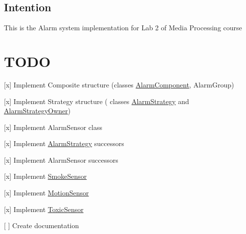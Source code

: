 \subsection*{Intention}

This is the Alarm system implementation for Lab 2 of Media Processing course

\section*{T\+O\+DO}


\begin{DoxyItemize}
\item \mbox{[}x\mbox{]} Implement Composite structure (classes \hyperlink{classAlarmComponent}{Alarm\+Component}, Alarm\+Group)
\item \mbox{[}x\mbox{]} Implement Strategy structure ( classes \hyperlink{classAlarmStrategy}{Alarm\+Strategy} and \hyperlink{classAlarmStrategyOwner}{Alarm\+Strategy\+Owner})
\item \mbox{[}x\mbox{]} Implement Alarm\+Sensor class
\item \mbox{[}x\mbox{]} Implement \hyperlink{classAlarmStrategy}{Alarm\+Strategy} successors
\item \mbox{[}x\mbox{]} Implement Alarm\+Sensor successors
\begin{DoxyItemize}
\item \mbox{[}x\mbox{]} Implement \hyperlink{classSmokeSensor}{Smoke\+Sensor}
\item \mbox{[}x\mbox{]} Implement \hyperlink{classMotionSensor}{Motion\+Sensor}
\item \mbox{[}x\mbox{]} Implement \hyperlink{classToxicSensor}{Toxic\+Sensor}
\end{DoxyItemize}
\item \mbox{[} \mbox{]} Create documentation 
\end{DoxyItemize}